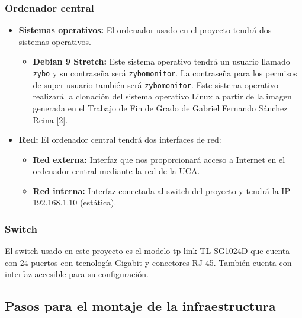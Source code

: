 \newpage
\subsubsection{Ordenador central}
\begin{itemize}
	\item \textbf{Sistemas operativos:} El ordenador usado en el proyecto tendrá dos sistemas operativos.
	\begin{itemize}
		\item \textbf{Debian 9 Stretch:} Este sistema operativo tendrá un usuario llamado \texttt{zybo} y su contraseña será \texttt{zybomonitor}. La contraseña para los permisos de super-usuario también será \texttt{zybomonitor}. Este sistema operativo realizará la clonación del sistema operativo Linux a partir de la imagen generada en el Trabajo de Fin de Grado de Gabriel Fernando Sánchez Reina \hyperlink{2}{[2]}.
	\end{itemize}

	\item \textbf{Red:} El ordenador central tendrá dos interfaces de red:
	\begin{itemize}
		\item \textbf{Red externa:} Interfaz que nos proporcionará acceso a Internet en el ordenador central mediante la red de la UCA.
		\item \textbf{Red interna:} Interfaz conectada al switch del proyecto y tendrá la IP 192.168.1.10 (estática).
	\end{itemize}
\end{itemize}


\subsubsection{Switch}
El switch usado en este proyecto es el modelo tp-link TL-SG1024D que cuenta con 24 puertos con tecnología Gigabit y conectores RJ-45. También cuenta con interfaz accesible para su configuración.


\subsection{Pasos para el montaje de la infraestructura}
